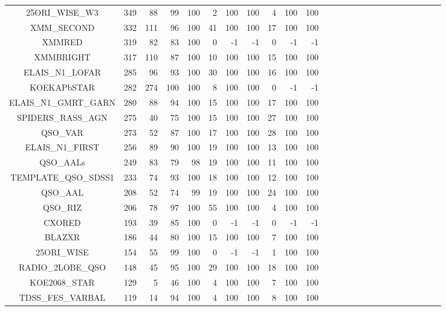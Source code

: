 \documentclass[onecolumn]{aa}
\begin{document}
\begin{center}
\begin{longtable}{c r rrrr rrrr rrrrr rrrrr rrrrr}
25ORI\_WISE\_W3          & 349    & 88     & 99  & 100 & 2     & 100 & 100  & 4 & 100 & 100 \\ 
XMM\_SECOND              & 332    & 111    & 96  & 100 & 41    & 100 & 100  & 17 & 100 & 100 \\ 
XMMRED                   & 319    & 82     & 83  & 100 & 0     & -1  & -1   & 0 & -1  & -1 \\ 
XMMBRIGHT                & 317    & 110    & 87  & 100 & 10    & 100 & 100  & 15 & 100 & 100 \\ 
ELAIS\_N1\_LOFAR         & 285    & 96     & 93  & 100 & 30    & 100 & 100  & 16 & 100 & 100 \\ 
KOEKAPbSTAR              & 282    & 274    & 100 & 100 & 8     & 100 & 100  & 0 & -1  & -1 \\ 
ELAIS\_N1\_GMRT\_GARN    & 280    & 88     & 94  & 100 & 15    & 100 & 100  & 17 & 100 & 100 \\ 
SPIDERS\_RASS\_AGN       & 275    & 40     & 75  & 100 & 15    & 100 & 100  & 27 & 100 & 100 \\ 
QSO\_VAR                 & 273    & 52     & 87  & 100 & 17    & 100 & 100  & 28 & 100 & 100 \\ 
ELAIS\_N1\_FIRST         & 256    & 89     & 90  & 100 & 19    & 100 & 100  & 13 & 100 & 100 \\ 
QSO\_AALs                & 249    & 83     & 79  & 98  & 19    & 100 & 100  & 11 & 100 & 100 \\ 
TEMPLATE\_QSO\_SDSS1     & 233    & 74     & 93  & 100 & 18    & 100 & 100  & 12 & 100 & 100 \\ 
QSO\_AAL                 & 208    & 52     & 74  & 99  & 19    & 100 & 100  & 24 & 100 & 100 \\ 
QSO\_RIZ                 & 206    & 78     & 97  & 100 & 55    & 100 & 100  & 4 & 100 & 100 \\ 
CXORED                   & 193    & 39     & 85  & 100 & 0     & -1  & -1   & 0 & -1  & -1 \\ 
BLAZXR                   & 186    & 44     & 80  & 100 & 15    & 100 & 100  & 7 & 100 & 100 \\ 
25ORI\_WISE              & 154    & 55     & 99  & 100 & 0     & -1  & -1   & 1  & 100 & 100 \\ 
RADIO\_2LOBE\_QSO        & 148    & 45     & 95  & 100 & 29    & 100 & 100  & 18 & 100 & 100 \\ 
KOE2068\_STAR            & 129    & 5      & 46  & 100 & 4     & 100 & 100  & 7 & 100 & 100 \\ 
TDSS\_FES\_VARBAL        & 119    & 14     & 94  & 100 & 4     & 100 & 100  & 8 & 100 & 100 \\ 

\end{longtable}
\end{center}
\end{document}
